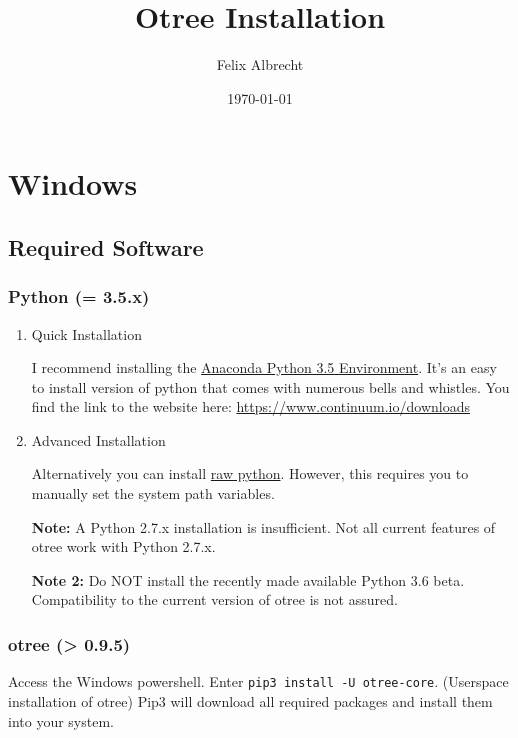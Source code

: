 \documentclass[11pt]{article}
\author{Felix Albrecht}
\date{\today}
\title{Otree Installation}
\newcommand{\mscode}[1]{\colorbox{blue!40!black}{\footnotesize\color{white}\tt #1}}
\begin{document}
\maketitle
\tableofcontents



\section{Windows}
\label{sec:orgheadline10}

\subsection{Required Software}
\label{sec:orgheadline5}

\subsubsection{Python (= 3.5.x)}
\label{sec:orgheadline3}

\begin{enumerate}
\item Quick Installation
\label{sec:orgheadline1}

I recommend installing the \href{https://www.continuum.io/downloads}{Anaconda Python 3.5 Environment}. It's an easy to install version of python that comes with numerous bells and whistles.
You find the link to the website here: \url{https://www.continuum.io/downloads}

\item Advanced Installation
\label{sec:orgheadline2}

Alternatively you can install \href{https://www.python.org/downloads/release/python-352/}{raw python}. However, this requires you to manually set the system path variables.

\textbf{Note:} A Python 2.7.x installation is insufficient. Not all current features of otree work with Python 2.7.x.

\textbf{Note 2:} Do NOT install the recently made available Python 3.6 beta. Compatibility to the current version of otree is not assured.
\end{enumerate}

\subsubsection{otree (> 0.9.5)}
\label{sec:orgheadline4}

Access the Windows powershell. Enter \mscode{pip3 install -U otree-core}. (Userspace installation of otree) Pip3 will download all required packages and install them into your system.
\end{document}
